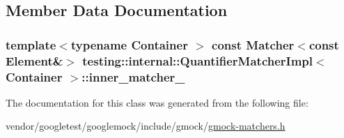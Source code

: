 \subsection{Member Data Documentation}
\subsubsection[{\texorpdfstring{inner\+\_\+matcher\+\_\+}{inner_matcher_}}]{\setlength{\rightskip}{0pt plus 5cm}template$<$typename Container $>$ const {\bf Matcher}$<$const {\bf Element}\&$>$ {\bf testing\+::internal\+::\+Quantifier\+Matcher\+Impl}$<$ Container $>$\+::inner\+\_\+matcher\+\_\+\hspace{0.3cm}{\ttfamily [protected]}}\hypertarget{classtesting_1_1internal_1_1QuantifierMatcherImpl_af0ee2a4697f5cb8e937fd29dd75e2a30}{}\label{classtesting_1_1internal_1_1QuantifierMatcherImpl_af0ee2a4697f5cb8e937fd29dd75e2a30}


The documentation for this class was generated from the following file\+:\begin{DoxyCompactItemize}
\item 
vendor/googletest/googlemock/include/gmock/\hyperlink{gmock-matchers_8h}{gmock-\/matchers.\+h}\end{DoxyCompactItemize}

